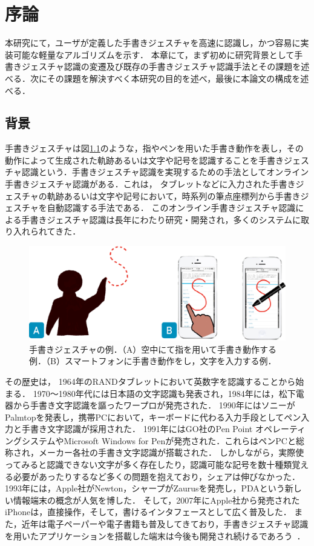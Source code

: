 \chapter{序論}
本研究にて，ユーザが定義した手書きジェスチャを高速に認識し，かつ容易に実装可能な軽量なアルゴリズムを示す．
本章にて，まず初めに研究背景として手書きジェスチャ認識の変遷及び既存の手書きジェスチャ認識手法とその課題を述べる．次にその課題を解決すべく本研究の目的を述べ，最後に本論文の構成を述べる．

\section{背景}
手書きジェスチャは図\ref{fig:handwriting}のような，指やペンを用いた手書き動作を表し，その動作によって生成された軌跡あるいは文字や記号を認識することを手書きジェスチャ認識という．手書きジェスチャ認識を実現するための手法としてオンライン手書きジェスチャ認識がある．これは，
タブレットなどに入力された手書きジェスチャの軌跡あるいは文字や記号において，時系列の筆点座標列から手書きジェスチャを自動認識する手法である．
このオンライン手書きジェスチャ認識による手書きジェスチャ認識は長年にわたり研究・開発され，多くのシステムに取り入れられてきた．

\begin{figure} [htbp]
\centering
\includegraphics [width=0.6\columnwidth]{img/handwriting.eps}
\caption{手書きジェスチャの例．（A）空中にて指を用いて手書き動作する例．（B）スマートフォンに手書き動作をし，文字を入力する例．}
\label{fig:handwriting}
\end{figure}


その歴史は，
1964年のRANDタブレットにおいて英数字を認識することから始まる．
1970〜1980年代には日本語の文字認識も発表され，1984年には，松下電器から手書き文字認識を謳ったワープロが発売された．
1990年にはソニーがPalmtopを発表し，携帯PCにおいて，キーボードに代わる入力手段としてペン入力と手書き文字認識が採用された．
1991年にはGO社のPen Point オペレーティングシステムやMicrosoft Windows for Penが発売された．これらはペンPCと総称され，メーカー各社の手書き文字認識が搭載された．
しかしながら，実際使ってみると認識できない文字が多く存在したり，認識可能な記号を数十種類覚える必要があったりするなど多くの問題を抱えており，シェアは伸びなかった．
1993年には，Apple社がNewton，シャープがZaurusを発売し，PDAという新しい情報端末の概念が人気を博した．
そして，2007年にApple社から発売されたiPhoneは，直接操作，そして，書けるインタフェースとして広く普及した．
また，近年は電子ペーパーや電子書籍も普及してきており，手書きジェスチャ認識を用いたアプリケーションを搭載した端末は今後も開発され続けるであろう~\cite{110009437469}．

